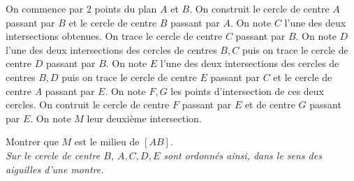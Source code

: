 On commence par 2 points du plan $A$ et $B$. On construit le cercle de centre $A$ passant par $B$ et le cercle de centre $B$ passant par $A$. On note $C$ l'une des deux intersections obtenues. On trace le cercle de centre $C$ passant par $B$. On note $D$ l'une des deux intersections des cercles de centres $B, C$ puis on trace le cercle de centre $D$ passant par $B$. On note $E$ l'une des deux intersections des cercles de centres $B, D$ puis on trace le cercle de centre $E$ passant par $C$ et le cercle de centre $A$ passant par $E$. On note $F, G$ les points d'intersection de ces deux cercles. On contruit le cercle de centre $F$ passant par $E$ et de centre $G$ passant par $E$. On note $M$ leur deuxième intersection.

Montrer que $M$ est le milieu de $[AB]$.\\
\textit{Sur le cercle de centre $B$, $A, C, D, E$ sont ordonnés ainsi, dans le sens des aiguilles d'une montre.}